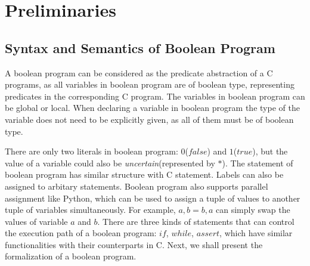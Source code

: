 
\section{Preliminaries}
\label{section:Preliminaries}
\subsection{Syntax and Semantics of Boolean Program}
\label{section:SyntaxAndSemanticsOfBooleanProgram}

A boolean program can be considered as the predicate abstraction of a C programs, as all variables in boolean program are of boolean type, representing predicates in the corresponding C program. The variables in boolean program can be global or local.
When declaring a variable in boolean program the type of the variable does not need to be explicitly given, as all of them must be of boolean type.

There are only two literals in boolean program: $0$($false$) and $1$($true$), but the value of a variable could also be {\it uncertain}(represented by $*$).
The statement of boolean program has similar structure with C statement. Labels can also be assigned to arbitary statements.
Boolean program also supports parallel assignment like Python, which can be used to assign a tuple of values to another tuple of variables simultaneously.
For example, $a, b = b, a$ can simply swap the values of variable $a$ and $b$.
There are three kinds of statements that can control the execution path of a boolean program: $if$, $while$, $assert$, which have similar functionalities with their counterparts in C.
Next, we shall present the formalization of a boolean program.

